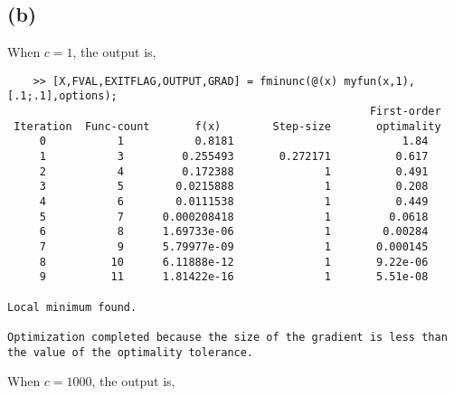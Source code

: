 \documentclass{article}
\begin{document}
\subsection*{(b)}
When $c = 1$, the output is,
\begin{verbatim}
    >> [X,FVAL,EXITFLAG,OUTPUT,GRAD] = fminunc(@(x) myfun(x,1),[.1;.1],options);
                                                        First-order 
 Iteration  Func-count       f(x)        Step-size       optimality
     0           1           0.8181                          1.84
     1           3         0.255493       0.272171          0.617  
     2           4         0.172388              1          0.491  
     3           5        0.0215888              1          0.208  
     4           6        0.0111538              1          0.449  
     5           7      0.000208418              1         0.0618  
     6           8      1.69733e-06              1        0.00284  
     7           9      5.79977e-09              1       0.000145  
     8          10      6.11888e-12              1       9.22e-06  
     9          11      1.81422e-16              1       5.51e-08  

Local minimum found.

Optimization completed because the size of the gradient is less than
the value of the optimality tolerance.
\end{verbatim}
When $c = 1000$, the output is,
\end{document}
